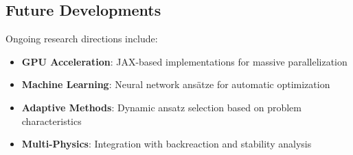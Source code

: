 \documentclass[12pt]{article}
\begin{document}
\subsection{Future Developments}

Ongoing research directions include:
\begin{itemize}
\item \textbf{GPU Acceleration}: JAX-based implementations for massive parallelization
\item \textbf{Machine Learning}: Neural network ansätze for automatic optimization
\item \textbf{Adaptive Methods}: Dynamic ansatz selection based on problem characteristics
\item \textbf{Multi-Physics}: Integration with backreaction and stability analysis
\end{itemize}
\end{document}
